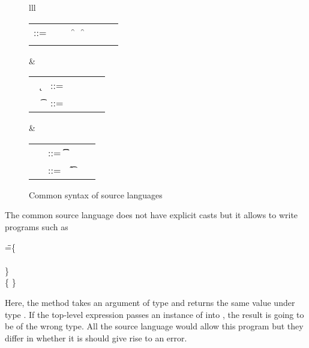\documentclass[acmlarge, anonymous, authordraft, review]{acmart} %
\begin{document}
\begin{figure}[!h]\hrulefill
\vspace{2mm}  \small


\begin{tabular}{lll}
\begin{minipage}{7cm}\begin{tabular}{@{}l@{~}l@{}l@{}l@{}l@{}l@{}l@{}l}
\e\hspace{.1cm} ::= & \hspace{.2cm} \x        
    &\B \this         
   &\B \FRead\f     
   &\B \FWrite\f\e   
   &\B \Call\e\m\e \\
   &
   &\B \that      
   &\B \New\C{\e[1]..}  
\end{tabular}\end{minipage}&
\begin{minipage}{4.4cm}\begin{tabular}{l@{~}l@{}l@{}ll}
   ~ \k &::= \Class \C {\fd[1]..}{\md[1]..} \\
~ \t&::= ~ \any  \B   \C  \B \src{\CW}  \\ 
\end{tabular}\end{minipage} &
\begin{minipage}{2.9cm}\begin{tabular}{l@{~}l@{}l@{}l}
\md &::= \Mdef\m\x\t\t\e \\
~\fd&::= ~ \Fdef\f\t \\ 
\end{tabular}\end{minipage}\end{tabular}

\vspace{2mm}\hrulefill
\caption{Common syntax of source languages}\label{f:sourcesyntax}
\end{figure}


The common source language does not have explicit casts but it allows to
write programs such as

\begin{tabbing}
\hspace{1cm}\K\HS \Call{\New\C{}}\m{\New\D{}} \HS\HS\HS\WHERE\HS
  \K\HS =\HS \= \class\= \C \{\\
       \>  \>\Mdef\m\x\any\C{\HS\x\HS}\\
       \> \}  \\
       \>\class \D \{ \}
\end{tabbing}         

\noindent
Here, the method \m takes an argument of type \any and returns the same
value under type \C.  If the top-level expression passes an instance of \D
into \m, the result is going to be of the wrong type. All the source
language would allow this program but they differ in whether it is should
give rise to an error. 
\end{document}
